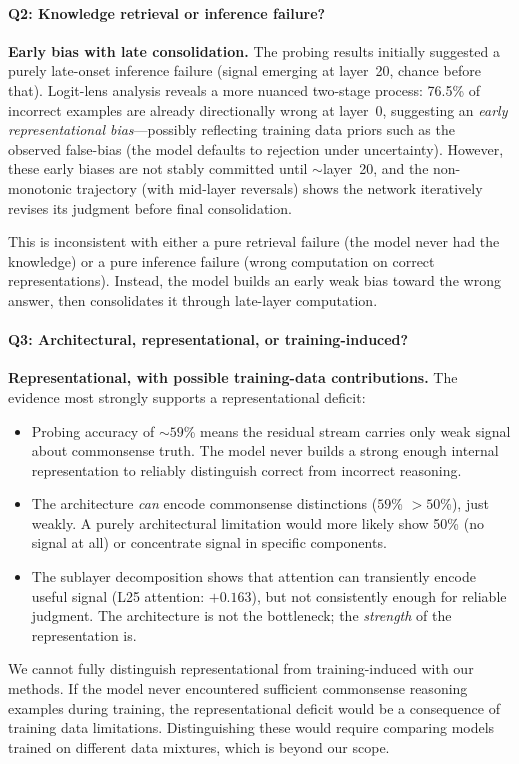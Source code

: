 \documentclass{article}
\begin{document}
\paragraph{Q2: Knowledge retrieval or inference failure?}
\textbf{Early bias with late consolidation.}
The probing results initially suggested a purely late-onset inference failure (signal emerging at layer~20, chance before that).
Logit-lens analysis reveals a more nuanced two-stage process:
76.5\% of incorrect examples are already directionally wrong at layer~0, suggesting an \emph{early representational bias}---possibly reflecting training data priors such as the observed false-bias (the model defaults to rejection under uncertainty).
However, these early biases are not stably committed until ${\sim}$layer~20, and the non-monotonic trajectory (with mid-layer reversals) shows the network iteratively revises its judgment before final consolidation.

This is inconsistent with either a pure retrieval failure (the model never had the knowledge) or a pure inference failure (wrong computation on correct representations).
Instead, the model builds an early weak bias toward the wrong answer, then consolidates it through late-layer computation.

\paragraph{Q3: Architectural, representational, or training-induced?}
\textbf{Representational, with possible training-data contributions.}
The evidence most strongly supports a representational deficit:
\begin{itemize}
    \item Probing accuracy of ${\sim}59$\% means the residual stream carries only weak signal about commonsense truth. The model never builds a strong enough internal representation to reliably distinguish correct from incorrect reasoning.
    \item The architecture \emph{can} encode commonsense distinctions ($59$\% $> 50$\%), just weakly. A purely architectural limitation would more likely show 50\% (no signal at all) or concentrate signal in specific components.
    \item The sublayer decomposition shows that attention can transiently encode useful signal (L25 attention: $+0.163$), but not consistently enough for reliable judgment. The architecture is not the bottleneck; the \emph{strength} of the representation is.
\end{itemize}
We cannot fully distinguish representational from training-induced with our methods.
If the model never encountered sufficient commonsense reasoning examples during training, the representational deficit would be a consequence of training data limitations.
Distinguishing these would require comparing models trained on different data mixtures, which is beyond our scope.
\end{document}
